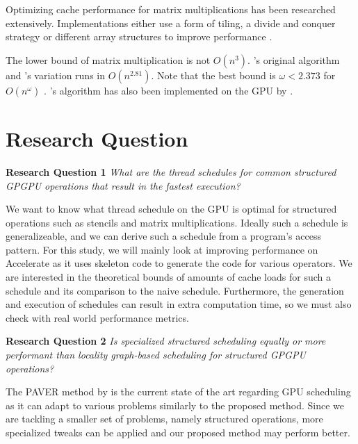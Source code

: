 \documentclass{article}
\begin{document}
Optimizing cache performance for matrix multiplications has been researched extensively.
Implementations either use a form of tiling, a divide and conquer strategy or different array structures to improve performance \cite{bader2006cache,frigo1999cache}.

The lower bound of matrix multiplication is not $O(n^3)$.
\citeauthor{strassen1969gaussian}'s original algorithm \cite{strassen1969gaussian} and \citeauthor{winograd1971multiplication}'s variation \cite{strassen1969gaussian} runs in $O(n^{2.81})$.
Note that the best bound is $\omega < 2.373$ for $O(n^\omega)$ \cite{alman2018limits}.
\citeauthor{strassen1969gaussian}'s algorithm has also been implemented on the GPU by \citet{li2011strassen}.

\section{Research Question}

\begin{mdframed}
    \textbf{Research Question 1}
    \emph{What are the thread schedules for common structured GPGPU operations that result in the fastest execution?}
\end{mdframed}
We want to know what thread schedule on the GPU is optimal for structured operations such as stencils and matrix multiplications.
Ideally such a schedule is generalizeable, and we can derive such a schedule from a program's access pattern.
For this study, we will mainly look at improving performance on Accelerate as it uses skeleton code to generate the code for various operators.
We are interested in the theoretical bounds of amounts of cache loads for such a schedule and its comparison to the naive schedule.
Furthermore, the generation and execution of schedules can result in extra computation time, so we must also check with real world performance metrics.

\begin{mdframed}
    \textbf{Research Question 2}
    \emph{Is specialized structured scheduling equally or more performant than locality graph-based scheduling for structured GPGPU operations?}
\end{mdframed}
The PAVER method by \citet{tripathy2021paver} is the current state of the art regarding GPU scheduling as it can adapt to various problems similarly to the proposed method.
Since we are tackling a smaller set of problems, namely structured operations, more specialized tweaks can be applied and our proposed method may perform better.
\end{document}
